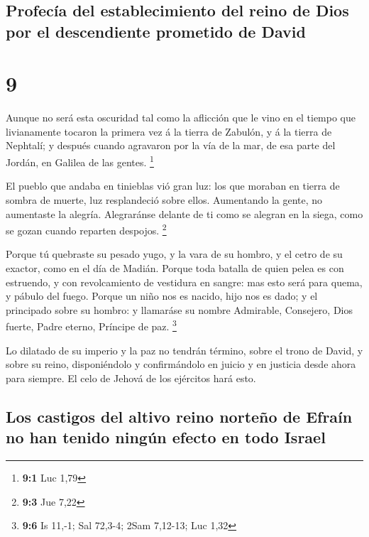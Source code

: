 \hypertarget{profecuxeda-del-establecimiento-del-reino-de-dios-por-el-descendiente-prometido-de-david}{%
\subsection{Profecía del establecimiento del reino de Dios por el
descendiente prometido de
David}\label{profecuxeda-del-establecimiento-del-reino-de-dios-por-el-descendiente-prometido-de-david}}

\hypertarget{section-8}{%
\section{9}\label{section-8}}

 Aunque no será esta oscuridad tal como la aflicción que
le vino en el tiempo que livianamente tocaron la primera vez á la tierra
de Zabulón, y á la tierra de Nephtalí; y después cuando agravaron por la
vía de la mar, de esa parte del Jordán, en Galilea de las gentes.
\footnote{\textbf{9:1} Luc 1,79}

 El pueblo que andaba en tinieblas vió gran luz: los que
moraban en tierra de sombra de muerte, luz resplandeció sobre ellos.
 Aumentando la gente, no aumentaste la alegría.
Alegraránse delante de ti como se alegran en la siega, como se gozan
cuando reparten despojos. \footnote{\textbf{9:3} Jue 7,22}

 Porque tú quebraste su pesado yugo, y la vara de su
hombro, y el cetro de su exactor, como en el día de Madián.
 Porque toda batalla de quien pelea es con estruendo, y
con revolcamiento de vestidura en sangre: mas esto será para quema, y
pábulo del fuego.  Porque un niño nos es nacido, hijo nos
es dado; y el principado sobre su hombro: y llamaráse su nombre
Admirable, Consejero, Dios fuerte, Padre eterno, Príncipe de paz.
\footnote{\textbf{9:6} Is 11,-1; Sal 72,3-4; 2Sam 7,12-13; Luc 1,32}

 Lo dilatado de su imperio y la paz no tendrán término,
sobre el trono de David, y sobre su reino, disponiéndolo y confirmándolo
en juicio y en justicia desde ahora para siempre. El celo de Jehová de
los ejércitos hará esto.

\hypertarget{los-castigos-del-altivo-reino-norteuxf1o-de-efrauxedn-no-han-tenido-ninguxfan-efecto-en-todo-israel}{%
\subsection{Los castigos del altivo reino norteño de Efraín no han
tenido ningún efecto en todo
Israel}\label{los-castigos-del-altivo-reino-norteuxf1o-de-efrauxedn-no-han-tenido-ninguxfan-efecto-en-todo-israel}}

